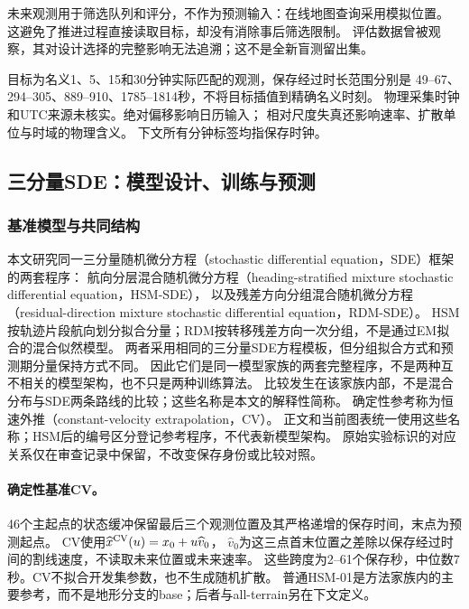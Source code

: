 未来观测用于筛选队列和评分，不作为预测输入：在线地图查询采用模拟位置。
这避免了推进过程直接读取目标，却没有消除事后筛选限制。
评估数据曾被观察，其对设计选择的完整影响无法追溯；这不是全新盲测留出集。

目标为名义1、5、15和30分钟实际匹配的观测，保存经过时长范围分别是
49--67、294--305、889--910、1785--1814秒，不将目标插值到精确名义时刻。
物理采集时钟和UTC来源未核实。绝对偏移影响日历输入；
相对尺度失真还影响速率、扩散单位与时域的物理含义。
下文所有分钟标签均指保存时钟。

\subsection{三分量SDE：模型设计、训练与预测}\label{sec:models}\hypertarget{sec:models}{}
\subsubsection{基准模型与共同结构}
本文研究同一三分量随机微分方程（stochastic differential equation，SDE）框架的两套程序：
航向分层混合随机微分方程（heading-stratified mixture stochastic differential equation，HSM-SDE），
以及残差方向分组混合随机微分方程（residual-direction mixture stochastic differential equation，RDM-SDE）。
HSM按轨迹片段航向划分拟合分量；RDM按转移残差方向一次分组，不是通过EM拟合的混合似然模型。
两者采用相同的三分量SDE方程模板，但分组拟合方式和预测期分量保持方式不同。
因此它们是同一模型家族的两套完整程序，不是两种互不相关的模型架构，也不只是两种训练算法。
比较发生在该家族内部，不是混合分布与SDE两条路线的比较；这些名称是本文的解释性简称。
确定性参考称为恒速外推（constant-velocity extrapolation，CV）。
正文和当前图表统一使用这些名称；HSM后的编号区分登记参考程序，不代表新模型架构。
原始实验标识的对应关系仅在审查记录中保留，不改变保存身份或比较对照。

\paragraph{确定性基准CV。}
46个主起点的状态缓冲保留最后三个观测位置及其严格递增的保存时间，末点为预测起点。
CV使用$\widehat x^{\rm CV}(u)=x_0+u\widehat v_0$，
$\widehat v_0$为这三点首末位置之差除以保存经过时间的割线速度，不读取未来位置或未来速率。
这些跨度为2--61个保存秒，中位数7秒。CV不拟合开发集参数，也不生成随机扩散。
普通HSM-01是方法家族内的主要参考，而不是地形分支的base；后者与all-terrain另在下文定义。
